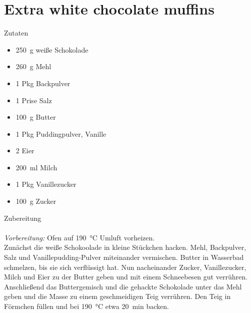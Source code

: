 \section*{Extra white chocolate muffins}
\ihead{}\ohead{}
\cfoot{}
{\Large Zutaten}
\begin{multicols}{2}
\begin{itemize}
    \item \SI{250}{g} weiße Schokolade
    \item \SI{260}{g} Mehl
    \item \num{1} Pkg Backpulver
    \item \num{1} Prise Salz
    \item \SI{100}{g} Butter
    \item \num{1} Pkg Puddingpulver, Vanille
    \item \num{2} Eier
    \item \SI{200}{ml} Milch
    \item \num{1} Pkg Vanillezucker
    \item \SI{100}{g} Zucker
\end{itemize}
\end{multicols}
\noindent
{\Large Zubereitung}\\
\\
\textit{Vorbereitung:} Ofen auf \SI{190}{\celsius} Umluft vorheizen.\\
Zunächst die weiße Schokoolade in kleine Stückchen hacken.
Mehl, Backpulver, Salz und Vanillepudding-Pulver miteinander vermischen.
Butter in Wasserbad schmelzen, bis sie sich verflüssigt hat.
Nun nacheinander Zucker, Vanillezucker, Milch und Eier zu der Butter geben und mit einem Schneebesen gut verrühren.
Anschließend das Buttergemisch und die gehackte Schokolade unter das Mehl geben und die Masse zu einem geschmeidigen Teig verrühren.
Den Teig in Förmchen füllen und bei \SI{190}{\celsius} etwa \SI{20}{min} backen.
